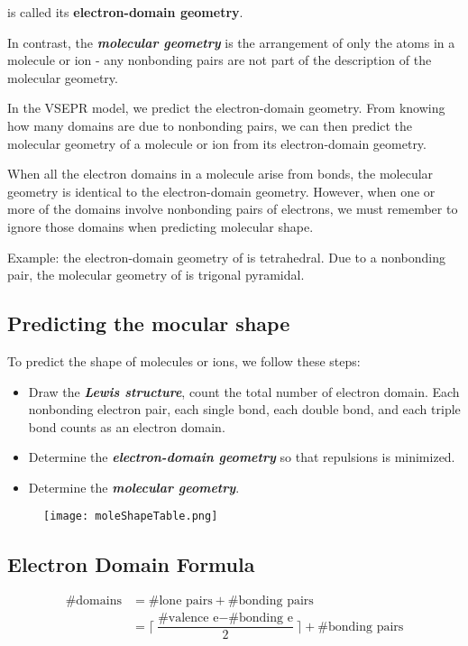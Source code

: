 \documentclass[12pt, a4paper]{report}
\newcommand{\impt}[1]{\textbf{\textit{#1}}}
\newcommand{\hii}{\subsection}
\begin{document}
        is called its \textbf{electron-domain geometry}.
        \par In contrast, the \impt{molecular geometry} is the arrangement of only the atoms in a
        molecule or ion - any nonbonding pairs are not part of the description of the molecular
        geometry.
        \par In the VSEPR model, we predict the electron-domain geometry. From knowing how many
        domains are due to nonbonding pairs, we can then predict the molecular geometry of a
        molecule or ion from its electron-domain geometry.
        \par When all the electron domains in a molecule arise from bonds, the molecular geometry is
        identical to the electron-domain geometry. However, when one or more of the domains involve
        nonbonding pairs of electrons, we must remember to ignore those domains when predicting
        molecular shape.
        \par Example: the electron-domain geometry of  is tetrahedral. Due to a nonbonding
        pair, the molecular geometry of  is trigonal pyramidal.
    \hii{Predicting the mocular shape}
        \par To predict the shape of molecules or ions, we follow these steps:
        \begin{itemize}
            \item Draw the \impt{Lewis structure}, count the total number of electron domain.
                Each nonbonding electron pair, each single bond, each double bond, and each triple
                bond counts as an electron domain.
            \item Determine the \impt{electron-domain geometry} so that repulsions is minimized.
            \item Determine the \impt{molecular geometry}.
        \end{itemize}
        \begin{center}
            \begin{figure}[h]
                    \begin{center}
                        \texttt{[image: moleShapeTable.png]}
                    \end{center}
            \end{figure}
        \end{center}
    \hii{Electron Domain Formula}
        \begin{align}
            \mbox{\# domains} &=  \mbox{\# lone pairs} + \mbox{\# bonding pairs} \\
            &= \lceil \dfrac{\mbox{\# valence e} - \mbox{\# bonding e}}{2} \rceil + \mbox{\# bonding pairs}
        \end{align}
\end{document}
